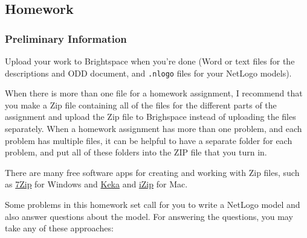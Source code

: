 \documentclass[
]{article}
\begin{document}
\hypertarget{homework-3}{%
\subsection{Homework}\label{homework-3}}

\hypertarget{preliminary-information-2}{%
\subsubsection{Preliminary
Information}\label{preliminary-information-2}}

Upload your work to Brightspace when you're done (Word or text files for
the descriptions and ODD document, and \texttt{.nlogo} files for your
NetLogo models).

When there is more than one file for a homework assignment, I recommend
that you make a Zip file containing all of the files for the different
parts of the assignment and upload the Zip file to Brighspace instead of
uploading the files separately. When a homework assignment has more than
one problem, and each problem has multiple files, it can be helpful to
have a separate folder for each problem, and put all of these folders
into the ZIP file that you turn in.

There are many free software apps for creating and working with Zip
files, such as \href{https://www.7-zip.org/}{7Zip} for Windows and
\href{https://www.keka.io/en/}{Keka} and
\href{https://www.izip.com}{iZip} for Mac.

Some problems in this homework set call for you to write a NetLogo model
and also answer questions about the model. For answering the questions,
you may take any of these approaches:
\end{document}
